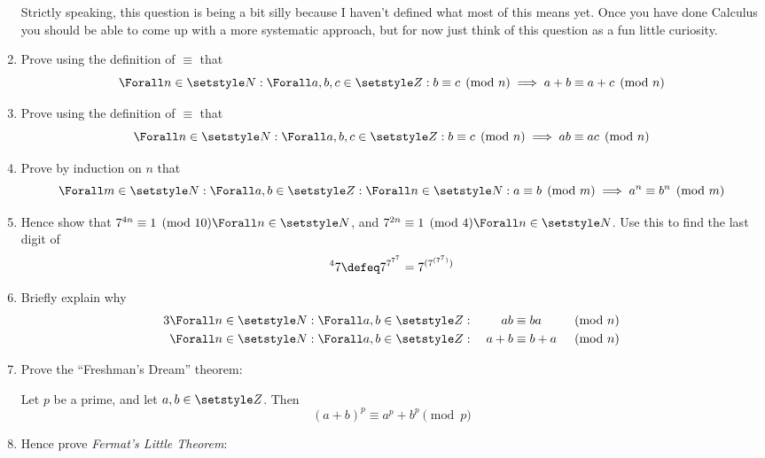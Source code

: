 \begin{enumerate}
  Strictly speaking, this question is being a bit silly because I haven't
  defined what most of this means yet. Once you have done Calculus you should be
  able to come up with a more systematic approach, but for now just think of
  this question as a fun little curiosity.
 \item
  Prove using the definition of \(\equiv\) that
  \begin{equation*}
   \Forall n \in \Naturals :
   \Forall a, b, c \in \Integers :
   b \equiv c \pmod n \implies
   a + b \equiv a + c \pmod n
  \end{equation*}
 \item
  Prove using the definition of \(\equiv\) that
  \begin{equation*}
   \Forall n \in \Naturals :
   \Forall a, b, c \in \Integers :
   b \equiv c \pmod n \implies
   ab \equiv ac \pmod n
  \end{equation*}
 \item
  Prove by induction on \(n\) that
  \begin{equation*}
    \Forall m \in \Naturals :
    \Forall a, b \in \Integers :
    \Forall n \in \Naturals :
    a \equiv b \pmod m \implies
    a^n \equiv b^n \pmod m
  \end{equation*}
 \item
  Hence show that \(7^{4n} \equiv 1 \pmod{10} \Forall n \in \Naturals\), and
  \(7^{2n} \equiv 1 \pmod 4 \Forall n \in \Naturals\). Use
  this to find the last digit of
  \begin{equation*}
   {}^4 7 \defeq 7^{7^{7^7}} = 7^{(7^{(7^7)})}
  \end{equation*}
 \item
  Briefly explain why
  \begin{alignat*}3
   \Forall n \in \Naturals :
   \Forall a, b \in \Integers &:{}
   &ab&\equiv ba &&\pmod n \\
   \Forall n \in \Naturals :
   \Forall a, b \in \Integers &:{}
   &a + b&\equiv b + a &&\pmod n
  \end{alignat*}
 \item
  Prove the ``Freshman's Dream'' theorem:

  Let \(p\) be a prime, and let \(a, b \in \Integers\). Then
  \begin{equation*}
   (a + b)^p \equiv a^p + b^p \pmod p
  \end{equation*}
 \item
  Hence prove \emph{Fermat's Little Theorem}:


\end{enumerate}
